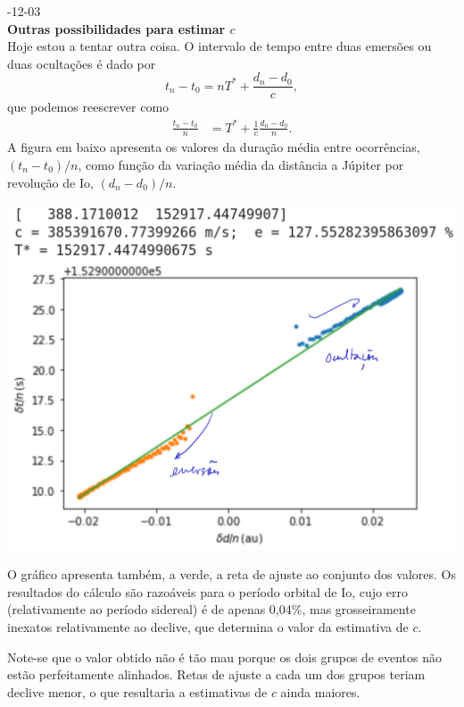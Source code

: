 \documentclass[]{article}
\newcommand{\newlog}[2]{%
  \par
  \vspace{\baselineskip}
  \noindent
  #1\\
  \textbf{#2}\\
}
\begin{document}
\newlog{2024-12-03}{Outras possibilidades para estimar $c$}
Hoje estou a tentar outra coisa. O intervalo de tempo entre duas emersões ou
duas ocultações é dado por
\begin{equation*}
  t_n-t_0=nT^*+\frac{d_n-d_0}{c},
\end{equation*}
que podemos reescrever como
\begin{align*}
  \frac{t_n-t_0}{n}&=T^*+\frac{1}{c}\frac{d_n-d_0}{n}.
\end{align*}
A figura em baixo apresenta os valores da duração média entre ocorrências,
$(t_n-t_0)/n$, como função da variação média da distância a Júpiter por
revolução de Io, $(d_n-d_0)/n$.
\begin{center}
  \includegraphics[width=0.6\linewidth]{figs/2024-12-03.png}
\end{center}
O gráfico apresenta também, a verde, a reta de ajuste ao conjunto dos valores.
Os resultados do cálculo são razoáveis para o período orbital de Io, cujo erro
(relativamente ao período sidereal) é de apenas 0,04\%, mas grosseiramente
inexatos relativamente ao declive, que determina o valor da estimativa de $c$.

Note-se que o valor obtido não é tão mau porque os dois grupos de eventos não
estão perfeitamente alinhados. Retas de ajuste a cada um dos grupos teriam
declive menor, o que resultaria a estimativas de $c$ ainda maiores.
\end{document}
